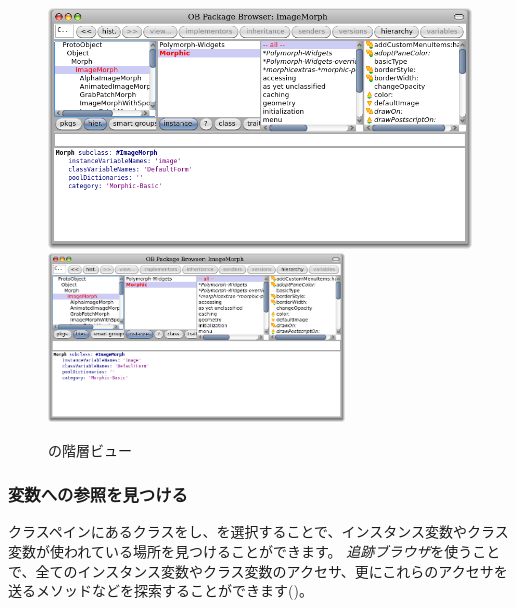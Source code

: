 \documentclass[a4paper,10pt,twoside]{book}
\begin{document}
\begin{figure}[btp]
\begin{center}
\ifluluelse
{\includegraphics[width=\textwidth]{hierarchyBrowser}}
{\includegraphics[width=0.7\textwidth]{hierarchyBrowser}}
\end{center}
\caption{の階層ビュー}
\end{figure}

\subsubsection{変数への参照を見つける}

クラスペインにあるクラスを\actclick し、を選択することで、インスタンス変数やクラス変数が使われている場所を見つけることができます。
\emph{追跡ブラウザ}を使うことで、全てのインスタンス変数やクラス変数のアクセサ、更にこれらのアクセサを送るメソッドなどを探索することができます()。
\end{document}
